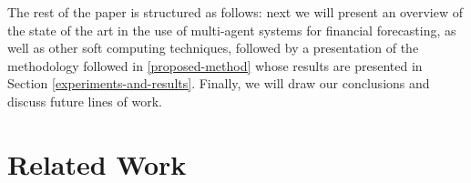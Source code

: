 \documentclass[a4paper,twoside]{article}
\begin{document}
The rest of the paper is structured as follows: next we will present
an overview of the state of the art in the use of multi-agent systems
for financial forecasting, as well as other soft computing techniques,
followed by a presentation of the methodology followed in
\ref{proposed-method} whose results are presented in Section
\ref{experiments-and-results}. Finally, we will draw our conclusions
and discuss future lines of work.

\section{Related Work}
\label{related-work}




\end{document}
